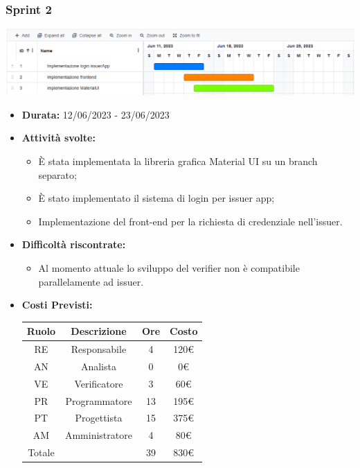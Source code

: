 \subsubsection{Sprint 2}
\begin{center}
    \includegraphics[scale = 0.45]{./res/img/Sprint_2.png}
  \end{center}

\begin{itemize}
    \item \textbf{Durata:} 12/06/2023 - 23/06/2023 
    \item \textbf{Attività svolte:}
    \begin{itemize}
        \item È stata implementata la libreria grafica Material UI su un branch separato;
        \item È stato implementato il sistema di login per issuer app; 
        \item Implementazione del front-end per la richiesta di credenziale nell'issuer.
    \end{itemize}
    \item \textbf{Difficoltà riscontrate:}
    \begin{itemize}
        \item Al momento attuale lo sviluppo del verifier non è compatibile parallelamente ad issuer.
    \end{itemize}
    \item \textbf{Costi Previsti:}
    \begin{longtable}{|c|c|c|c|}
        \hline
        Ruolo & Descrizione & Ore & Costo \\
        \hline
        RE & Responsabile & 4 & 120€ \\
        \hline
        AN & Analista & 0 & 0€ \\
        \hline
        VE & Verificatore & 3 & 60€ \\
        \hline
        PR & Programmatore & 13 & 195€ \\
        \hline
        PT & Progettista & 15 & 375€ \\
        \hline
        AM & Amministratore & 4 & 80€ \\
        \hline
        Totale & & 39 & 830€ \\

\end{longtable}
\end{itemize}
